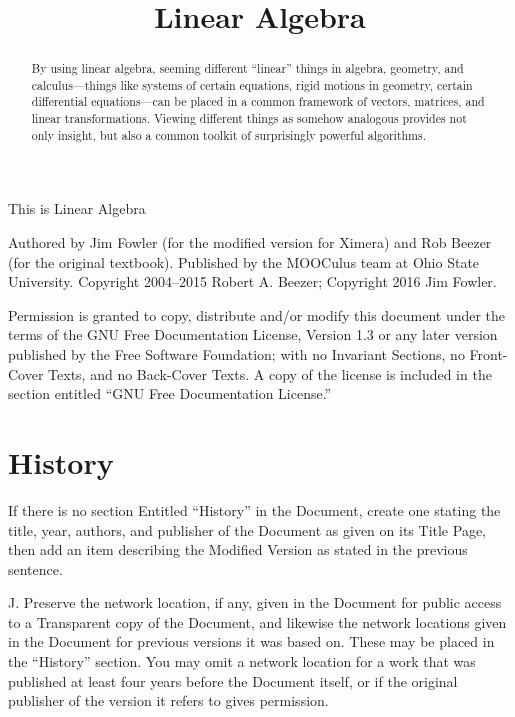 \documentclass{ximera}
\title{Linear Algebra}
\begin{document}
\begin{abstract}
By using linear algebra, seeming different ``linear'' things in algebra, geometry, and calculus—things like systems of certain equations, rigid motions in geometry, certain differential equations—can be placed in a common framework of vectors, matrices, and linear transformations.  Viewing different things as somehow analogous provides not only insight, but also a common toolkit of surprisingly powerful algorithms.
\end{abstract}
\maketitle

\begin{center}
\Huge This is Linear Algebra
\end{center}

Authored by Jim Fowler (for the modified version for Ximera) and Rob Beezer (for the original textbook).  Published by the MOOCulus team at Ohio State University.  Copyright 2004--2015 Robert A. Beezer; Copyright 2016 Jim Fowler.


Permission is granted to copy, distribute and/or modify this document
under the terms of the GNU Free Documentation License, Version 1.3
or any later version published by the Free Software Foundation;
with no Invariant Sections, no Front-Cover Texts, and no Back-Cover Texts.
A copy of the license is included in the section entitled ``GNU
Free Documentation License.''

\section{History}   
  If
   there is no section Entitled ``History'' in the Document, create one
   stating the title, year, authors, and publisher of the Document as
   given on its Title Page, then add an item describing the Modified
   Version as stated in the previous sentence.
   
\item[J.]
   Preserve the network location, if any, given in the Document for
   public access to a Transparent copy of the Document, and likewise
   the network locations given in the Document for previous versions
   it was based on.  These may be placed in the ``History'' section.
   You may omit a network location for a work that was published at
   least four years before the Document itself, or if the original
   publisher of the version it refers to gives permission.
\end{document}
